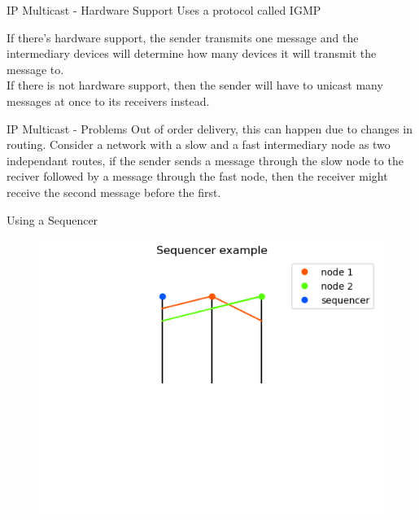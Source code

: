 \documentclass[aspectratio=1610,17pt,utf8]{beamer}
\begin{document}
\begin{frame}{IP Multicast - Hardware Support}
    Uses a protocol called IGMP

    If there's hardware support, the sender transmits one message and the intermediary devices will determine how many devices it will transmit the message to.\\
    If there is not hardware support, then the sender will have to unicast many messages at once to its receivers instead.
\end{frame}

\begin{frame}{IP Multicast - Problems}
    Out of order delivery, this can happen due to changes in routing. Consider a network with a slow and a fast intermediary node as two independant routes, if the sender sends a message through the slow node to the reciver followed by a message through the fast node, then the receiver might receive the second message before the first.
\end{frame}

\begin{frame}{Using a Sequencer}
    \begin{figure}
        \includegraphics[width=\textwidth]{figures/2-sequencer.png}
    \end{figure}
\end{frame}

\end{document}
